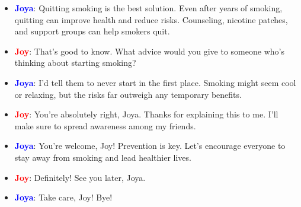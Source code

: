 \documentclass{article}
\begin{document}
\begin{itemize}
    \item \textbf{\textcolor{blue}{Joya}}: Quitting smoking is the best solution. Even after years of smoking, quitting can improve health and reduce risks. Counseling, nicotine patches, and support groups can help smokers quit.
    \item \textbf{\textcolor{red}{Joy}}: That’s good to know. What advice would you give to someone who’s thinking about starting smoking?
    \item \textbf{\textcolor{blue}{Joya}}: I’d tell them to never start in the first place. Smoking might seem cool or relaxing, but the risks far outweigh any temporary benefits.
    \item \textbf{\textcolor{red}{Joy}}: You’re absolutely right, Joya. Thanks for explaining this to me. I’ll make sure to spread awareness among my friends.
    \item \textbf{\textcolor{blue}{Joya}}: You’re welcome, Joy! Prevention is key. Let’s encourage everyone to stay away from smoking and lead healthier lives.
    \item \textbf{\textcolor{red}{Joy}}: Definitely! See you later, Joya.
    \item \textbf{\textcolor{blue}{Joya}}: Take care, Joy! Bye!
\end{itemize}
\end{document}
